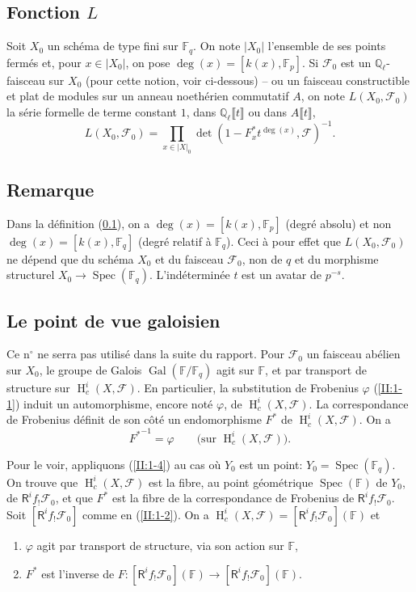 \documentclass{book}
\DeclareMathOperator{\gal}{Gal}
\DeclareMathOperator{\h}{H}
\DeclareMathOperator{\spec}{Spec}
\newcommand{\cF}{\mathcal{F}}
\newcommand{\dF}{\mathbb{F}}
\newcommand{\dQ}{\mathbb{Q}}
\newcommand{\R}{\mathsf{R}}
\begin{document}
\subsection{Fonction \texorpdfstring{$L$}{L}}\label{II:1-6}

Soit $X_0$ un schéma de type fini sur $\dF_q$. On note $|X_0|$ l'ensemble de 
ses points fermés et, pour $x\in |X_0|$, on pose $\deg(x)=[k(x),\dF_p]$. Si 
$\cF_0$ est un $\dQ_\ell$-faisceau sur $X_0$ (pour cette notion, voir 
ci-dessous) -- ou un faisceau constructible et plat de modules sur un 
anneau noethérien commutatif $A$, on note $L(X_0,\cF_0)$ la série formelle 
de terme constant $1$, dans $\dQ_\ell\llbracket t\rrbracket$ ou dans 
$A\llbracket t\rrbracket$, 
\[
  L(X_0,\cF_0) = \prod_{x\in|X|_0} \det\left(1-F_x^* t^{\deg(x)},\cF\right)^{-1} \text{.}
\]





\subsection{Remarque}\label{II:1-7}

Dans la définition (\ref{II:1-6}), on a $\deg(x)=[k(x),\dF_p]$ (degré 
absolu) et non $\deg(x)=[k(x),\dF_q]$ (degré relatif à $\dF_q$). Ceci à 
pour effet que $L(X_0,\cF_0)$ ne dépend que du schéma $X_0$ et du faisceau 
$\cF_0$, non de $q$ et du morphisme structurel $X_0\to\spec(\dF_q)$. 
L'indéterminée $t$ est un avatar de $p^{-s}$. 





\subsection{Le point de vue galoisien}\label{II:1-8}

Ce n$^\circ$ ne serra pas utilisé dans la suite du rapport. Pour $\cF_0$ un 
faisceau abélien sur $X_0$, le groupe de Galois $\gal(\dF/\dF_q)$ agit sur 
$\dF$, et par transport de structure sur $\h_c^i(X,\cF)$. En particulier, la 
substitution de Frobenius $\varphi$ (\ref{II:1-1}) induit un automorphisme, 
encore noté $\varphi$, de $\h_c^i(X,\cF)$. La correspondance de Frobenius 
définit de son côté un endomorphisme $F^*$ de $\h_c^i(X,\cF)$. On a 
\begin{equation}\label{II:eq:2}
  {F^*}^{-1} = \varphi \qquad \text{(sur $\h_c^i(X,\cF)$).}
\end{equation}

Pour le voir, appliquons (\ref{II:1-4}) au cas où $Y_0$ est un point: 
$Y_0=\spec(\dF_q)$. On trouve que $\h_c^i(X,\cF)$ est la fibre, au point 
géométrique $\spec(\dF)$ de $Y_0$, de $\R^i f_! \cF_0$, et que $F^*$ est 
la fibre de la correspondance de Frobenius de $\R^i f_!\cF_0$. Soit 
$[\R^i f_! \cF_0]$ comme en (\ref{II:1-2}). On a 
$\h_c^i(X,\cF) = [\R^i f_!\cF_0](\dF)$ et 
\begin{enumerate}[\indent a)]
  \item $\varphi$ agit par transport de structure, via son action sur $\dF$, 
  \item $F^*$ est l'inverse de 
    $F:[\R^i f_!\cF_0](\dF) \to [\R^i f_!\cF_0](\dF)$. 
\end{enumerate}
\end{document}
